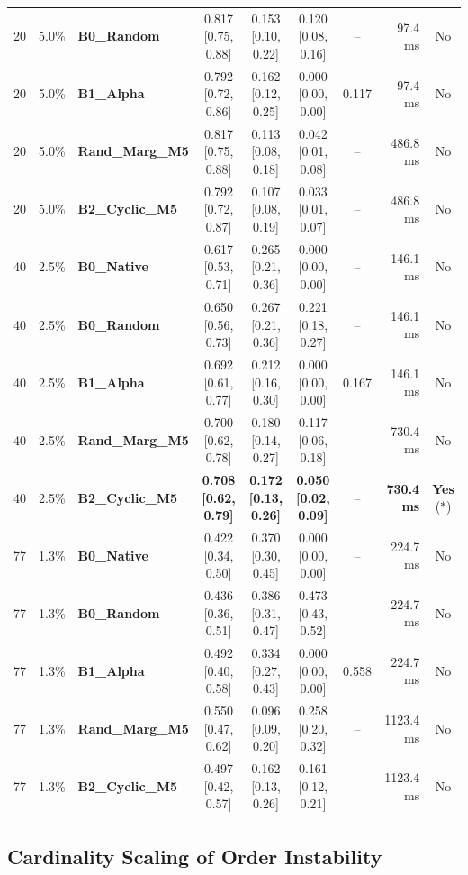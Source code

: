 \documentclass[11pt,a4paper]{article}
\begin{document}
\begin{table}[t]
{\begin{tabular}{r c l c c c c r c}
20 & 5.0\% & \textbf{B0\_Random} & 0.817 [0.75, 0.88] & 0.153 [0.10, 0.22] & 0.120 [0.08, 0.16] & -- & 97.4 ms & No \\
20 & 5.0\% & \textbf{B1\_Alpha}  & 0.792 [0.72, 0.86] & 0.162 [0.12, 0.25] & 0.000 [0.00, 0.00] & 0.117 & 97.4 ms & No \\
20 & 5.0\% & \textbf{Rand\_Marg\_M5} & 0.817 [0.75, 0.88] & 0.113 [0.08, 0.18] & 0.042 [0.01, 0.08] & -- & 486.8 ms & No \\
20 & 5.0\% & \textbf{B2\_Cyclic\_M5} & 0.792 [0.72, 0.87] & 0.107 [0.08, 0.19] & 0.033 [0.01, 0.07] & -- & 486.8 ms & No \\
\midrule
40 & 2.5\% & \textbf{B0\_Native} & 0.617 [0.53, 0.71] & 0.265 [0.21, 0.36] & 0.000 [0.00, 0.00] & -- & 146.1 ms & No \\
40 & 2.5\% & \textbf{B0\_Random} & 0.650 [0.56, 0.73] & 0.267 [0.21, 0.36] & 0.221 [0.18, 0.27] & -- & 146.1 ms & No \\
40 & 2.5\% & \textbf{B1\_Alpha}  & 0.692 [0.61, 0.77] & 0.212 [0.16, 0.30] & 0.000 [0.00, 0.00] & 0.167 & 146.1 ms & No \\
40 & 2.5\% & \textbf{Rand\_Marg\_M5} & 0.700 [0.62, 0.78] & 0.180 [0.14, 0.27] & 0.117 [0.06, 0.18] & -- & 730.4 ms & No \\
40 & 2.5\% & \textbf{B2\_Cyclic\_M5} & \textbf{0.708 [0.62, 0.79]} & \textbf{0.172 [0.13, 0.26]} & \textbf{0.050 [0.02, 0.09]} & -- & \textbf{730.4 ms} & \textbf{Yes} ($*$) \\
\midrule
77 & 1.3\% & \textbf{B0\_Native} & 0.422 [0.34, 0.50] & 0.370 [0.30, 0.45] & 0.000 [0.00, 0.00] & -- & 224.7 ms & No \\
77 & 1.3\% & \textbf{B0\_Random} & 0.436 [0.36, 0.51] & 0.386 [0.31, 0.47] & 0.473 [0.43, 0.52] & -- & 224.7 ms & No \\
77 & 1.3\% & \textbf{B1\_Alpha}  & 0.492 [0.40, 0.58] & 0.334 [0.27, 0.43] & 0.000 [0.00, 0.00] & 0.558 & 224.7 ms & No \\
77 & 1.3\% & \textbf{Rand\_Marg\_M5} & 0.550 [0.47, 0.62] & 0.096 [0.09, 0.20] & 0.258 [0.20, 0.32] & -- & 1123.4 ms & No \\
77 & 1.3\% & \textbf{B2\_Cyclic\_M5} & 0.497 [0.42, 0.57] & 0.162 [0.13, 0.26] & 0.161 [0.12, 0.21] & -- & 1123.4 ms & No \\
\bottomrule
\end{tabular}%
}
\end{table}

\subsection{Cardinality Scaling of Order Instability}
\end{document}

